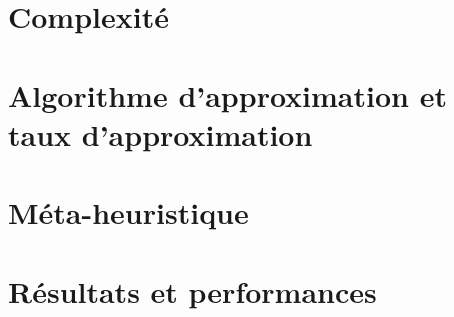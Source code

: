 \documentclass[11pt,french]{report}
\begin{document}
	\section{Complexité}
	
	\section{Algorithme d'approximation et taux d'approximation}
	
	\section{Méta-heuristique}
	
	\section{Résultats et performances}
\end{document}
